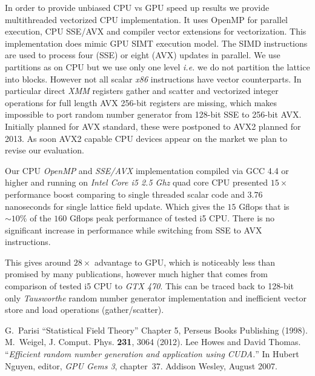 \documentclass[a4paper]{llncs}
\begin{document}
In order to provide unbiased CPU vs GPU speed up results we provide
multithreaded vectorized CPU implementation. It uses OpenMP for
parallel execution, CPU SSE/AVX and compiler vector extensions for
vectorization.  This implementation does mimic GPU SIMT execution
model.  The SIMD instructions are used to process four (SSE) or eight
(AVX) updates in parallel. We use partitions as on CPU but we use only
one level {\em i.e.} we do not partition the lattice into blocks.
However not all scalar \emph{x86} instructions have vector
counterparts.  In particular direct \emph{XMM} registers gather and
scatter and vectorized integer operations for full length AVX 256-bit
registers are missing, which makes impossible to port random number
generator from 128-bit SSE to 256-bit AVX. Initially planned for AVX
standard, these were postponed to AVX2 planned for 2013. As soon AVX2
capable CPU devices appear on the market we plan to revise our
evaluation.


Our CPU \emph{OpenMP} and \emph{SSE/AVX} implementation compiled via
GCC 4.4 or higher and running on \emph{Intel Core i5 2.5 Ghz} quad
core CPU presented $15\times$ performance boost comparing to single
threaded scalar code and $3.76$ nanoseconds for single lattice field
update.  Which gives the $15$ Gflops that is $\sim10\%$ of the  $160$
Gflops peak performance of tested i5 CPU. There is no significant
increase in performance while switching from SSE to AVX instructions.

This gives around $28\times$ advantage to GPU, which is noticeably
less than promised by many publications, however much higher that
comes from comparison of  tested i5
CPU to \emph{GTX 470}. This can be
traced back to 128-bit only \emph{Tausworthe} random number generator
implementation and inefficient vector store and load operations
(gather/scatter).

\begin{thebibliography}{9}
 G.~Parisi ``Statistical Field Theory'' Chapter 5, Perseus Books Publishing (1998).
 M.~Weigel, J. Comput. Phys. \textbf{231}, 3064 (2012).
Lee Howes and David Thomas.
``{\em Efficient random number generation and application using {CUDA}.}''
In Hubert Nguyen, editor, {\em GPU Gems 3}, chapter~37. Addison
  Wesley, August 2007.
\end{thebibliography}
\end{document}
